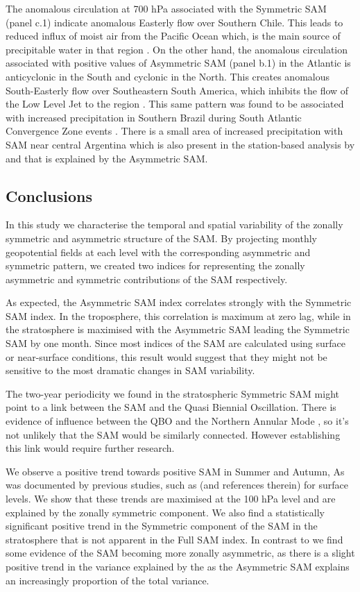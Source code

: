 \documentclass[]{ametsocV5}
\begin{document}
The anomalous circulation at 700 hPa associated with the Symmetric SAM (panel c.1) indicate anomalous Easterly flow over Southern Chile. This leads to reduced influx of moist air from the Pacific Ocean which, is the main source of precipitable water in that region \citep{garreaud2007}. On the other hand, the anomalous circulation associated with positive values of Asymmetric SAM (panel b.1) in the Atlantic is anticyclonic in the South and cyclonic in the North. This creates anomalous South-Easterly flow over Southeastern South America, which inhibits the flow of the Low Level Jet to the region \citep{silvestri2009, zamboni2010}. This same pattern was found to be associated with increased precipitation in Southern Brazil during South Atlantic Convergence Zone events \citep{rosso2018}. There is a small area of increased precipitation with SAM near central Argentina which is also present in the station-based analysis by \citet{gillett2006} and that is explained by the Asymmetric SAM.

\subsection{Conclusions}

In this study we characterise the temporal and spatial variability of the zonally symmetric and asymmetric structure of the SAM. By projecting monthly geopotential fields at each level with the corresponding asymmetric and symmetric pattern, we created two indices for representing the zonally asymmetric and symmetric contributions of the SAM respectively.

As expected, the Asymmetric SAM index correlates strongly with the Symmetric SAM index. In the troposphere, this correlation is maximum at zero lag, while in the stratosphere is maximised with the Asymmetric SAM leading the Symmetric SAM by one month. Since most indices of the SAM are calculated using surface or near-surface conditions, this result would suggest that they might not be sensitive to the most dramatic changes in SAM variability.

The two-year periodicity we found in the stratospheric Symmetric SAM might point to a link between the SAM and the Quasi Biennial Oscillation. There is evidence of influence between the QBO and the Northern Annular Mode \citep[e.g.][]{holton1980, watson2014, zhang2020}, so it's not unlikely that the SAM would be similarly connected. However establishing this link would require further research.

We observe a positive trend towards positive SAM in Summer and Autumn, As was documented by previous studies, such as \citet{fogt2020} (and references therein) for surface levels. We show that these trends are maximised at the 100 hPa level and are explained by the zonally symmetric component. We also find a statistically significant positive trend in the Symmetric component of the SAM in the stratosphere that is not apparent in the Full SAM index. In contrast to \citet{fogt2012} we find some evidence of the SAM becoming more zonally asymmetric, as there is a slight positive trend in the variance explained by the as the Asymmetric SAM explains an increasingly proportion of the total variance.
\end{document}

